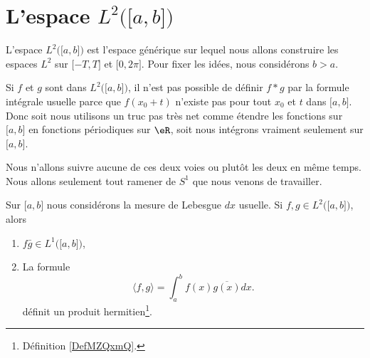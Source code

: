 \section{L'espace \( L^2\big( \mathopen[ a , b \mathclose] \big)\)}

L'espace \( L^2\big( \mathopen[ a , b \mathclose] \big)\) est l'espace générique sur lequel nous allons construire les espaces \( L^2\) sur \( \mathopen[ -T , T \mathclose]\) et \( \mathopen[ 0 , 2\pi \mathclose]\). Pour fixer les idées, nous considérons \( b>a\).

Si \( f\) et \( g\) sont dans \( L^2\big( \mathopen[ a , b \mathclose] \big)\), il n'est pas possible de définir \( f*g\) par la formule intégrale usuelle parce que \( f(x_0+t)\) n'existe pas pour tout \( x_0\) et \( t\) dans \( \mathopen[ a , b \mathclose]\). Donc soit nous utilisons un truc pas très net comme étendre les fonctions sur \( \mathopen[ a , b \mathclose]\) en fonctions périodiques sur \( \eR\), soit nous intégrons vraiment seulement sur \( \mathopen[ a , b \mathclose]\).

Nous n'allons suivre aucune de ces deux voies ou plutôt les deux en même temps. Nous allons seulement tout ramener de \( S^1\) que nous venons de travailler. 

\begin{propositionDef}
    Sur \( \mathopen[ a , b \mathclose]\) nous considérons la mesure de Lebesgue \( dx\) usuelle. Si \( f,g\in L^2\big( \mathopen[ a , b \mathclose] \big)\), alors 
    \begin{enumerate}
        \item
            \( f\bar g\in L^1\big( \mathopen[ a , b \mathclose] \big)\),
        \item
            La formule
            \begin{equation}    \label{EQooCRSXooPEopzm}
        \langle f, g\rangle =\int_a^bf(x)\overline{ g(x) }dx.
    \end{equation}
    définit un produit hermitien\footnote{Définition \ref{DefMZQxmQ}.}.
    \end{enumerate}
\end{propositionDef}

